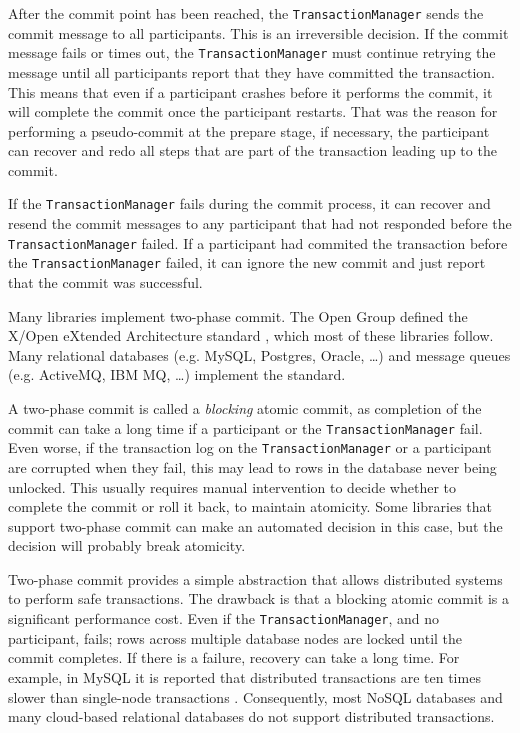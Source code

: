 After the commit point has been reached, the \texttt{TransactionManager} sends the commit message to all participants.
This is an irreversible decision.
If the commit message fails or times out, the \texttt{TransactionManager} must continue retrying the message
until all participants report that they have committed the transaction.
This means that even if a participant crashes before it performs the commit, it will complete the commit once the participant restarts.
That was the reason for performing a pseudo-commit at the prepare stage,
if necessary, the participant can recover and redo all steps that are part of the transaction leading up to the commit.

If the \texttt{TransactionManager} fails during the commit process,
it can recover and resend the commit messages to any participant that had not responded before the \texttt{TransactionManager} failed.
If a participant had commited the transaction before the \texttt{TransactionManager} failed,
it can ignore the new commit and just report that the commit was successful.

Many libraries implement two-phase commit.
The Open Group defined the X/Open eXtended Architecture standard \cite{xa-std}, which most of these libraries follow.
Many relational databases (e.g. MySQL, Postgres, Oracle, \dots) and message queues (e.g. ActiveMQ, IBM MQ, \dots)
implement the standard.

A two-phase commit is called a \emph{blocking} atomic commit,
as completion of the commit can take a long time if a participant or the \texttt{TransactionManager} fail.
Even worse, if the transaction log on the \texttt{Transaction\-Manager} or a participant are corrupted when they fail,
this may lead to rows in the database never being unlocked.
This usually requires manual intervention to decide whether to complete the commit or roll it back, to maintain atomicity.
Some libraries that support two-phase commit can make an automated decision in this case,
but the decision will probably break atomicity.

Two-phase commit provides a simple abstraction that allows distributed systems to perform safe transactions.
The drawback is that a blocking atomic commit is a significant performance cost.
Even if the \texttt{TransactionManager}, and no participant, fails;
rows across multiple database nodes are locked until the commit completes.
If there is a failure, recovery can take a long time.
For example, in MySQL it is reported that distributed transactions are ten times slower than single-node transactions \cite{distrib-mysql}.
Consequently, most NoSQL databases and many cloud-based relational databases do not support distributed transactions.

